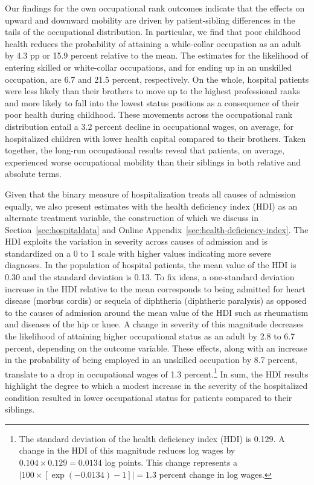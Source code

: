 \documentclass[12pt,english]{article}
\begin{document}
Our findings for the own occupational rank outcomes indicate that the effects on upward and downward mobility are driven by patient-sibling differences in the tails of the occupational distribution. In particular, we find that poor childhood health reduces the probability of attaining a while-collar occupation as an adult by 4.3 pp or 15.9 percent relative to the mean. The estimates for the likelihood of entering skilled or white-collar occupations, and for ending up in an unskilled occupation, are 6.7 and 21.5 percent, respectively. On the whole, hospital patients were less likely than their brothers to move up to the highest professional ranks and more likely to fall into the lowest status positions as a consequence of their poor health during childhood. These movements across the occupational rank distribution entail a 3.2 percent decline in occupational wages, on average, for hospitalized children with lower health capital compared to their brothers. Taken together, the long-run occupational results reveal that patients, on average, experienced worse occupational mobility than their siblings in both relative and absolute terms. 

Given that the binary measure of hospitalization treats all causes of admission equally, we also present estimates with the health deficiency index (HDI) as an alternate treatment variable, the construction of which we discuss in Section~\ref{sec:hospitaldata} and Online Appendix~\ref{sec:health-deficiency-index}. The HDI exploits the variation in severity across causes of admission and is standardized on a 0 to 1 scale with higher values indicating more severe diagnoses. In the population of hospital patients, the mean value of the HDI is 0.30 and the standard deviation is 0.13. To fix ideas, a one-standard deviation increase in the HDI relative to the mean corresponds to being admitted for heart disease (morbus cordis) or sequela of diphtheria (diphtheric paralysis) as opposed to the causes of admission around the mean value of the HDI such as rheumatism and diseases of the hip or knee. A change in severity of this magnitude decreases the likelihood of attaining higher occupational status as an adult by 2.8 to 6.7 percent, depending on the outcome variable. These effects, along with an increase in the probability of being employed in an unskilled occupation by 8.7 percent, translate to a drop in occupational wages of 1.3 percent.\footnote{The standard deviation of the health deficiency index (HDI) is 0.129. A change in the HDI of this magnitude reduces log wages by $0.104 \times 0.129 = 0.0134$ log points. This change represents a $\mid 100 \times [\exp(-0.0134) - 1] \mid = 1.3$ percent change in log wages.} In sum, the HDI results highlight the degree to which a modest increase in the severity of the hospitalized condition resulted in lower occupational status for patients compared to their siblings.
\end{document}
